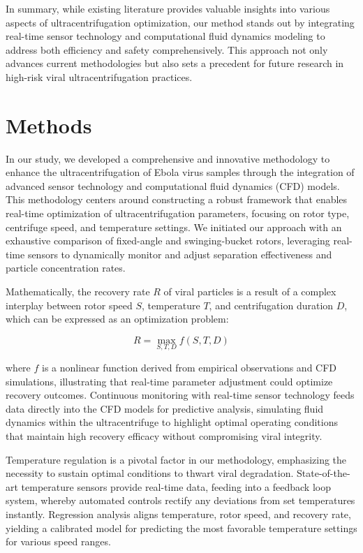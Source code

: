 \documentclass{article}
\begin{document}
In summary, while existing literature provides valuable insights into various aspects of ultracentrifugation optimization, our method stands out by integrating real-time sensor technology and computational fluid dynamics modeling to address both efficiency and safety comprehensively. This approach not only advances current methodologies but also sets a precedent for future research in high-risk viral ultracentrifugation practices.

\section{Methods}
In our study, we developed a comprehensive and innovative methodology to enhance the ultracentrifugation of Ebola virus samples through the integration of advanced sensor technology and computational fluid dynamics (CFD) models. This methodology centers around constructing a robust framework that enables real-time optimization of ultracentrifugation parameters, focusing on rotor type, centrifuge speed, and temperature settings. We initiated our approach with an exhaustive comparison of fixed-angle and swinging-bucket rotors, leveraging real-time sensors to dynamically monitor and adjust separation effectiveness and particle concentration rates.

Mathematically, the recovery rate \( R \) of viral particles is a result of a complex interplay between rotor speed \( S \), temperature \( T \), and centrifugation duration \( D \), which can be expressed as an optimization problem:

\[
R = \max_{S, T, D} f(S, T, D)
\]

where \( f \) is a nonlinear function derived from empirical observations and CFD simulations, illustrating that real-time parameter adjustment could optimize recovery outcomes. Continuous monitoring with real-time sensor technology feeds data directly into the CFD models for predictive analysis, simulating fluid dynamics within the ultracentrifuge to highlight optimal operating conditions that maintain high recovery efficacy without compromising viral integrity.

Temperature regulation is a pivotal factor in our methodology, emphasizing the necessity to sustain optimal conditions to thwart viral degradation. State-of-the-art temperature sensors provide real-time data, feeding into a feedback loop system, whereby automated controls rectify any deviations from set temperatures instantly. Regression analysis aligns temperature, rotor speed, and recovery rate, yielding a calibrated model for predicting the most favorable temperature settings for various speed ranges.
\end{document}
